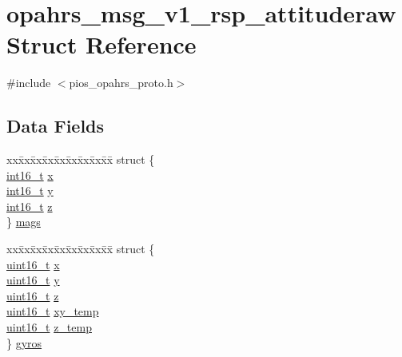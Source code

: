 \hypertarget{structopahrs__msg__v1__rsp__attituderaw}{\section{opahrs\-\_\-msg\-\_\-v1\-\_\-rsp\-\_\-attituderaw Struct Reference}
\label{structopahrs__msg__v1__rsp__attituderaw}
}


{\ttfamily \#include $<$pios\-\_\-opahrs\-\_\-proto.\-h$>$}

\subsection*{Data Fields}
\begin{DoxyCompactItemize}
\item 
\begin{tabbing}
xx\=xx\=xx\=xx\=xx\=xx\=xx\=xx\=xx\=\kill
struct \{\\
\>\hyperlink{stdint_8h_aa343fa3b3d06292b959ffdd4c4703b06}{int16\_t} \hyperlink{structopahrs__msg__v1__rsp__attituderaw_a07a09e0f4ad188bb8cd0a320474e7a01}{x}\\
\>\hyperlink{stdint_8h_aa343fa3b3d06292b959ffdd4c4703b06}{int16\_t} \hyperlink{structopahrs__msg__v1__rsp__attituderaw_aaa509b191de60b71c18f62cd4ba1cef5}{y}\\
\>\hyperlink{stdint_8h_aa343fa3b3d06292b959ffdd4c4703b06}{int16\_t} \hyperlink{structopahrs__msg__v1__rsp__attituderaw_af25a185c32759304ebe68076dc5aaeef}{z}\\
\} \hyperlink{structopahrs__msg__v1__rsp__attituderaw_a54ea363b8dbcb11432882768394f38d5}{mags}\\

\end{tabbing}\item 
\begin{tabbing}
xx\=xx\=xx\=xx\=xx\=xx\=xx\=xx\=xx\=\kill
struct \{\\
\>\hyperlink{stdint_8h_a273cf69d639a59973b6019625df33e30}{uint16\_t} \hyperlink{structopahrs__msg__v1__rsp__attituderaw_a994d9ef426987b507ca1b3e187a1850d}{x}\\
\>\hyperlink{stdint_8h_a273cf69d639a59973b6019625df33e30}{uint16\_t} \hyperlink{structopahrs__msg__v1__rsp__attituderaw_aeb210f6aac1e78cea5c120ac4d9ceb8c}{y}\\
\>\hyperlink{stdint_8h_a273cf69d639a59973b6019625df33e30}{uint16\_t} \hyperlink{structopahrs__msg__v1__rsp__attituderaw_ae177e8ba695905c87953348712ded024}{z}\\
\>\hyperlink{stdint_8h_a273cf69d639a59973b6019625df33e30}{uint16\_t} \hyperlink{structopahrs__msg__v1__rsp__attituderaw_ae0e8a729f11ef0b69380fd8f6d3d251c}{xy\_temp}\\
\>\hyperlink{stdint_8h_a273cf69d639a59973b6019625df33e30}{uint16\_t} \hyperlink{structopahrs__msg__v1__rsp__attituderaw_a769a1a90325d8484a26456bb26342ffa}{z\_temp}\\
\} \hyperlink{structopahrs__msg__v1__rsp__attituderaw_a9057250436f1515bab5cc0d596e649b0}{gyros}\\


\end{tabbing}
\end{DoxyCompactItemize}
